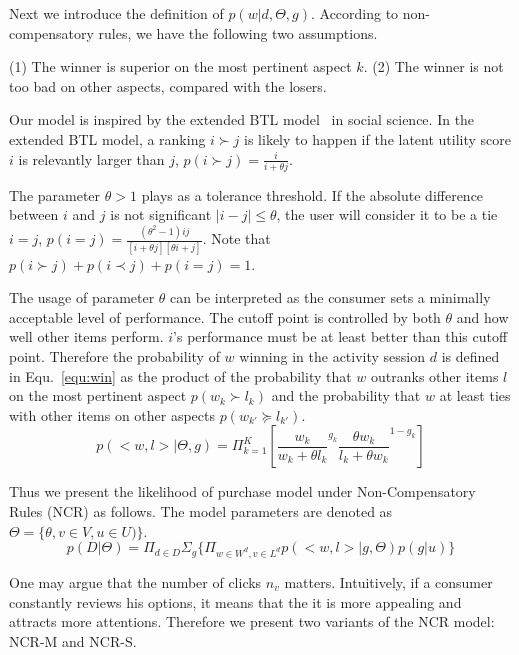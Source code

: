 \documentclass[sigconf]{acmart}
\begin{document}
Next we introduce the definition of $p(w|d,\Theta,g)$. According to non-compensatory rules, we have the following two assumptions.

(1) The winner is superior on the most pertinent aspect $k$.
(2)  The winner is not too bad on other aspects, compared with the losers. 
  
Our model is inspired by the extended BTL model~\cite{Hunter2004MM} in social science. In the extended BTL model, a ranking $i \succ j$ is likely to happen if the latent utility score $i$ is relevantly larger than $j$, $p(i \succ j)=\frac{i}{i+ \theta j}$.  
  
 The parameter $\theta>1$ plays as a tolerance threshold. If the absolute difference between $i$ and $j$ is not significant $|i-j|\leq \theta$, the user will consider it to be a tie $i=j$, $p(i = j)=\frac{(\theta^2-1)i j}{[i+\theta j][\theta i+ j]}$. Note that $p(i \succ j)+ p(i \prec j) + p(i=j) =1$. 
 
The usage of parameter $\theta$ can be interpreted as the consumer sets a minimally acceptable level of performance. The cutoff point is controlled by both $\theta$ and how well other items perform. $i$'s performance must be at least better than this cutoff point. Therefore the probability of  $w$ winning in the activity session $d$ is defined in Equ.~\ref{equ:win} as the product of the probability that $w$ outranks other items $l$ on the most pertinent aspect $p(w_k\succ l_k)$ and the probability that $w$ at least ties with other items on other aspects $p(w_{k'} \succeq l_{k'})$.
\begin{equation}\label{equ:win}
p(<w,l>|\Theta,g)  =  \Pi_{k=1}^{K}[ {\frac{w_k}{w_k+\theta l_k}}^{g_k} { \frac{\theta w_{k}}{l_{k}+\theta w_{k}}}^{1-g_k}]
\end{equation}

Thus we present the likelihood of purchase model under Non-Compensatory Rules (NCR) as follows. The model parameters are denoted as $\Theta=\{\theta,v\in V, u\in U)\}$.     
\begin{equation}\label{equ:likelihood}
		p(D|\Theta)=\Pi_{d\in D} \Sigma_{g} \{\Pi_{w\in W^d, v\in L^d} p(<w,l>|g,\Theta) p(g|u)\}
\end{equation}

One may argue that the number of clicks $n_v$ matters. Intuitively, if a consumer constantly reviews his options, it means that the it is more appealing and attracts more attentions. Therefore we present two variants of the NCR model: NCR-M and NCR-S.
\end{document}
